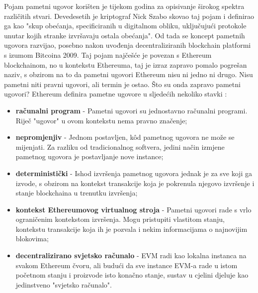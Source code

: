 \documentclass[times, utf8, diplomski]{fer}
\begin{document}
Pojam pametni ugovor korišten je tijekom godina za opisivanje širokog spektra različitih stvari. Devedesetih je kriptograf Nick Szabo skovao taj pojam i definirao ga kao "skup obećanja, specificiranih u digitalnom obliku, uključujući protokole unutar kojih stranke izvršavaju ostala obećanja". Od tada se koncept pametnih ugovora razvijao,  posebno nakon uvođenja decentraliziranih blockchain platformi s izumom Bitcoina 2009. Taj pojam najčešće je povezan s Ethereum blockchainom, no u kontekstu Ethereuma, taj je izraz zapravo pomalo pogrešan naziv, s obzirom na to da pametni ugovori Ethereum nisu ni jedno ni drugo. Nisu pametni niti pravni ugovori, ali termin je ostao.
Što su onda zapravo pametni ugovori? Ethereum definira pametne ugovore u sljedećih nekoliko stavki \cite{ethereum-smart-contract}:

\begin{itemize}

\item \textbf{računalni program} - Pametni ugovori su jednostavno računalni programi. Riječ "ugovor" u ovom kontekstu nema pravno značenje;

\item \textbf{nepromjenjiv} - Jednom postavljen, kôd pametnog ugovora ne može se mijenjati. Za razliku od tradicionalnog softvera, jedini način izmjene pametnog ugovora je postavljanje nove instance;

\item \textbf{deterministički} - Ishod izvršenja pametnog ugovora jednak je za sve koji ga izvode, s obzirom na kontekst transakcije koja je pokrenula njegovo izvršenje i stanje blockchaina u trenutku izvršenja;

\item \textbf{kontekst Ethereumovog virtualnog stroja} - Pametni ugovori rade s vrlo ograničenim kontekstom izvršenja. Mogu pristupiti vlastitom stanju, kontekstu transakcije koja ih je pozvala i nekim informacijama o najnovijim blokovima;

\item \textbf{decentralizirano svjetsko računalo} - EVM radi kao lokalna instanca na svakom Ethereum čvoru, ali budući da sve instance EVM-a rade u istom početnom stanju i proizvode isto konačno stanje, sustav u cjelini djeluje kao jedinstveno "svjetsko računalo".

\end{itemize}
\end{document}
